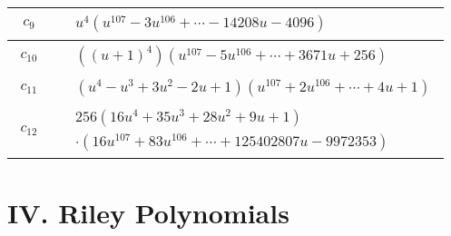 \documentclass[1p]{elsarticle_modified}
\theoremstyle{definition}
\begin{document}
\begin{tabular}{m{50pt}|m{274pt}}
\hline $$\begin{aligned}c_{9}\end{aligned}$$&$\begin{aligned}
&u^4(u^{107}-3 u^{106}+\cdots-14208 u-4096)
\end{aligned}$\\
\hline $$\begin{aligned}c_{10}\end{aligned}$$&$\begin{aligned}
&((u+1)^4)(u^{107}-5 u^{106}+\cdots+3671 u+256)
\end{aligned}$\\
\hline $$\begin{aligned}c_{11}\end{aligned}$$&$\begin{aligned}
&(u^4- u^3+3 u^2-2 u+1)(u^{107}+2 u^{106}+\cdots+4 u+1)
\end{aligned}$\\
\hline $$\begin{aligned}c_{12}\end{aligned}$$&$\begin{aligned}
&256(16 u^4+35 u^3+28 u^2+9 u+1)\\
&\cdot(16 u^{107}+83 u^{106}+\cdots+125402807 u-9972353)
\end{aligned}$\\
\hline
\end{tabular}\newpage\renewcommand{\arraystretch}{1}
\centering \section*{ IV. Riley Polynomials}
\end{document}
